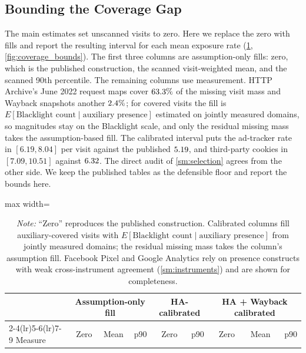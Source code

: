 \documentclass[12pt, letterpaper]{article}
\begin{document}
\subsection{Bounding the Coverage Gap}
\label{sm:coverage_bounds}

The main estimates set unscanned visits to zero. Here we replace the zero with fills and report the resulting interval for each mean exposure rate (\cref{tab:coverage_bounds}, \cref{fig:coverage_bounds}). The first three columns are assumption-only fills: zero, which is the published construction, the scanned visit-weighted mean, and the scanned 90th percentile. The remaining columns use measurement. HTTP Archive's June 2022 request maps cover $63.3\%$ of the missing visit mass and Wayback snapshots another $2.4\%$; for covered visits the fill is $E[\text{Blacklight count} \mid \text{auxiliary presence}]$ estimated on jointly measured domains, so magnitudes stay on the Blacklight scale, and only the residual missing mass takes the assumption-based fill. The calibrated interval puts the ad-tracker rate in $[6.19, 8.04]$ per visit against the published $5.19$, and third-party cookies in $[7.09, 10.51]$ against $6.32$. The direct audit of \cref{sm:selection} agrees from the other side. We keep the published tables as the defensible floor and report the bounds here.

\begin{table}[ht]
\centering
\caption{Mean exposure rates under alternative fills for unscanned visits}
\label{tab:coverage_bounds}
\begin{adjustbox}{max width=\textwidth}
\begin{tabular}{lrrrrrrrr}
\toprule
& \multicolumn{3}{c}{Assumption-only fill} & \multicolumn{2}{c}{HA-calibrated} & \multicolumn{3}{c}{HA + Wayback calibrated} \\
\cmidrule(lr){2-4}\cmidrule(lr){5-6}\cmidrule(lr){7-9}
Measure & Zero & Mean & p90 & Zero & p90 & Zero & Mean & p90 \\
\midrule

\bottomrule
\end{tabular}
\end{adjustbox}
\caption*{\textit{Note:} ``Zero'' reproduces the published construction. Calibrated columns fill auxiliary-covered visits with $E[\text{Blacklight count} \mid \text{auxiliary presence}]$ from jointly measured domains; the residual missing mass takes the column's assumption fill. Facebook Pixel and Google Analytics rely on presence constructs with weak cross-instrument agreement (\cref{sm:instruments}) and are shown for completeness.}
\end{table}
\end{document}
